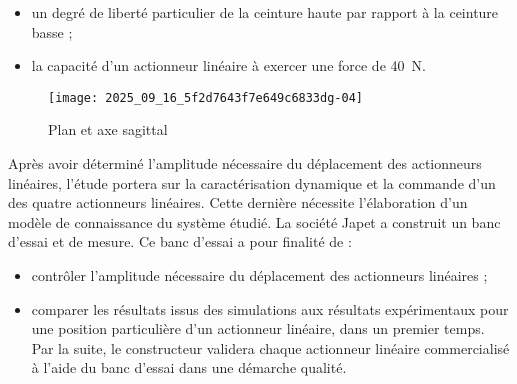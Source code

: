 \begin{itemize}
  \item un degré de liberté particulier de la ceinture haute par rapport à la ceinture basse ;
  \item la capacité d'un actionneur linéaire à exercer une force de \SI{40}{N}.
\end{itemize}


\begin{figure}[!h]
\centering
\texttt{[image: 2025\_09\_16\_5f2d7643f7e649c6833dg-04]}
\caption{\label{ccs_mp_2023_fig_05}  Plan et axe sagittal}
\end{figure}


Après avoir déterminé l'amplitude nécessaire du déplacement des actionneurs linéaires, l'étude portera sur la caractérisation dynamique et la commande d'un des quatre actionneurs linéaires. Cette dernière nécessite l'élaboration d'un modèle de connaissance du système étudié. La société Japet a construit un banc d'essai et de mesure. Ce banc d'essai a pour finalité de :

\begin{itemize}
  \item contrôler l'amplitude nécessaire du déplacement des actionneurs linéaires ;
  \item comparer les résultats issus des simulations aux résultats expérimentaux pour une position particulière d'un actionneur linéaire, dans un premier temps.\\
Par la suite, le constructeur validera chaque actionneur linéaire commercialisé à l'aide du banc d'essai dans une démarche qualité.
\end{itemize}
